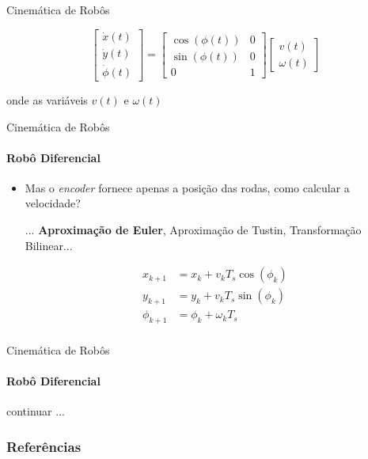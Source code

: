 \documentclass[aspectratio=169]{beamer}
\begin{document}
\begin{frame}{Cinemática de Robôs}
\begin{itemize}
              \begin{equation*}
                  \boxed{
                      \begin{bmatrix}
                          \dot{x}(t) \\
                          \dot{y}(t) \\
                          \dot{\phi}(t)
                      \end{bmatrix}
                      =
                      \begin{bmatrix}
                          \cos(\phi(t)) & 0 \\
                          \sin(\phi(t)) & 0 \\
                          0             & 1
                      \end{bmatrix}
                      \begin{bmatrix}
                          v(t) \\
                          \omega(t)
                      \end{bmatrix}}
              \end{equation*}

              onde as variáveis $v(t)$ e $\omega(t)$


    \end{itemize}
\end{frame}


\begin{frame}{Cinemática de Robôs}
    \framesubtitle{Robô Diferencial}
    \begin{itemize}
        \item Mas o \textit{encoder} fornece apenas a posição das rodas, como calcular a velocidade?

              ... \textbf{Aproximação de Euler}, Aproximação de Tustin, Transformação Bilinear...

              \begin{equation*}
                  \begin{split}
                      x_{k+1} &= x_k + v_k T_s\cos(\phi_k) \\
                      y_{k+1} &= y_k + v_k T_s\sin(\phi_k) \\
                      \phi_{k+1} &= \phi_k + \omega_k T_s \\
                  \end{split}
              \end{equation*}
    \end{itemize}
\end{frame}


\begin{frame}{Cinemática de Robôs}
    \framesubtitle{Robô Diferencial}

    continuar ...

\end{frame}


  
\begin{frame}[t, allowframebreaks]
	\frametitle{Referências}
	
\end{frame}
  
\end{document}
